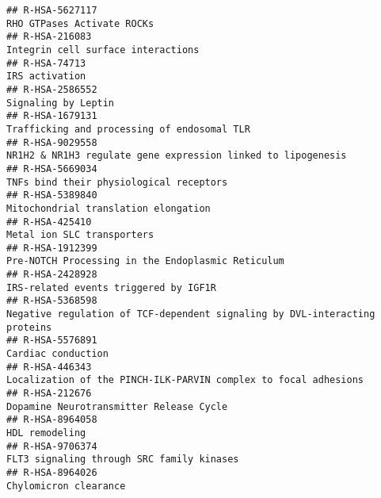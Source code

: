 \documentclass[
]{article}
\begin{document}
\begin{verbatim}
## R-HSA-5627117                                                                                                           RHO GTPases Activate ROCKs
## R-HSA-216083                                                                                                    Integrin cell surface interactions
## R-HSA-74713                                                                                                                         IRS activation
## R-HSA-2586552                                                                                                                  Signaling by Leptin
## R-HSA-1679131                                                                                          Trafficking and processing of endosomal TLR
## R-HSA-9029558                                                                         NR1H2 & NR1H3 regulate gene expression linked to lipogenesis
## R-HSA-5669034                                                                                              TNFs bind their physiological receptors
## R-HSA-5389840                                                                                                 Mitochondrial translation elongation
## R-HSA-425410                                                                                                            Metal ion SLC transporters
## R-HSA-1912399                                                                                    Pre-NOTCH Processing in the Endoplasmic Reticulum
## R-HSA-2428928                                                                                                IRS-related events triggered by IGF1R
## R-HSA-5368598                                                           Negative regulation of TCF-dependent signaling by DVL-interacting proteins
## R-HSA-5576891                                                                                                                   Cardiac conduction
## R-HSA-446343                                                                       Localization of the PINCH-ILK-PARVIN complex to focal adhesions
## R-HSA-212676                                                                                               Dopamine Neurotransmitter Release Cycle
## R-HSA-8964058                                                                                                                       HDL remodeling
## R-HSA-9706374                                                                                            FLT3 signaling through SRC family kinases
## R-HSA-8964026                                                                                                                Chylomicron clearance

\end{verbatim}
\end{document}

